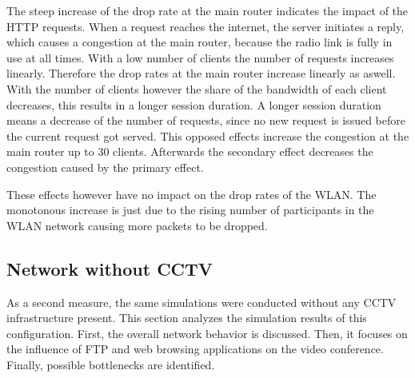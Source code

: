 \documentclass[
10pt, %
a4paper, %
oneside, %
headinclude,footinclude, %
BCOR5mm, %
]{scrartcl}
\begin{document}
The steep increase of the drop rate at the main router indicates the impact of the HTTP requests. When a request reaches the internet, the server initiates a reply, which causes a congestion at the main router, because the radio link is fully in use at all times. With a low number of clients the number of requests increases linearly. Therefore the drop rates at the main router increase linearly as aswell. With the number of clients however the share of the bandwidth of each client decreases, this results in a longer session duration. A longer session duration means a decrease of the number of requests, since no new request is issued before the current request got served. This opposed effects increase the congestion at the main router up to 30 clients. Afterwards the secondary effect decreases the congestion caused by the primary effect.

These effects however have no impact on the drop rates of the WLAN. The monotonous increase is just due to the rising number of participants in the WLAN network causing more packets to be dropped.

\subsection{Network without CCTV}
As a second measure, the same simulations were conducted without any CCTV infrastructure present. This section analyzes the simulation results of this configuration. First, the overall network behavior is discussed. Then, it focuses on the influence of FTP and web browsing applications on the video conference. Finally, possible bottlenecks are identified.
\end{document}
